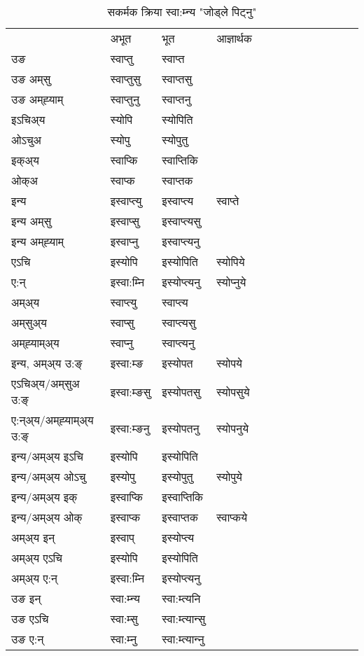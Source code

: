 \begin{table}[H]
\centering
\caption{\label{opt.vt} सकर्मक क्रिया  स्वा:म्‍न्य  "जोड्ले पिट्नु"  }
\begin{tabular}{l|l|l|l|l|l|l|l|l|l|l|l|l}  \toprule
&अभूत & भूत & आज्ञार्थक \\ 
उङ &स्वाप्‍तु &स्वाप्‍त \\ 
उङ अम्‌सु&स्वाप्‍तुसु &स्वाप्‍तसु \\ 
उङ अम्‌ह्‍याम्&स्वाप्‍तुनु &स्वाप्‍तनु \\ 
इऽचिअ्य &स्योपि &स्योपिति   \\ 
ओऽचुअ        &स्योपु &स्योपुतु   \\ 
इक्अ्य&स्वाप्कि &स्वाप्‍तिकि   \\ 
ओक्अ &स्वाप्क &स्वाप्‍तक   \\ 
इन्य & इस्वाप्‍त्यु  & इस्वाप्‍त्य &स्वाप्‍ते  \\ 
इन्य अम्‌सु& इस्वाप्सु  & इस्वाप्‍त्यसु   \\ 
इन्य अम्‌ह्‍याम्& इस्वाप्‍नु  & इस्वाप्‍त्यनु   \\ 
एऽचि & इस्योपि & इस्योपिति &स्योपिये    \\ 
ए:न् & इस्वा:म्‍नि  & इस्योप्‍त्यनु &स्योप्‍नुये  \\ 
अम्अ्य & स्वाप्‍त्यु  & स्वाप्‍त्य  \\ 
अम्‌सुअ्य & स्वाप्सु & स्वाप्‍त्यसु  \\ 
अम्‌ह्‍याम्अ्य & स्वाप्‍नु  & स्वाप्‍त्यनु \\ 
\midrule
इन्य, अम्अ्य उ:ङ्‌ &इस्वा:म्ङ &इस्योपत &स्योपये \\ 
एऽचिअ्य/अम्‌सुअ उ:ङ्‌ &इस्वा:म्ङसु &इस्योपतसु &स्योपसुये \\ 
ए:न्अ्य/अम्‌ह्‍याम्अ्य उ:ङ्‌ &इस्वा:म्ङनु &इस्योपतनु &स्योपनुये \\ 
इन्य/अम्अ्य इऽचि &इस्योपि &इस्योपिति    \\ 
इन्य/अम्अ्य ओऽचु &इस्योपु &इस्योपुतु  &स्योपुये  \\ 
इन्य/अम्अ्य इक् &इस्वाप्कि &इस्वाप्‍तिकि   \\ 
इन्य/अम्अ्य ओक् &इस्वाप्क &इस्वाप्‍तक  &स्वाप्कये  \\ 
अम्अ्य इन् & इस्वाप् & इस्योप्‍त्य   \\ 
अम्अ्य एऽचि & इस्योपि & इस्योपिति    \\ 
अम्अ्य ए:न् & इस्वा:म्‍नि  & इस्योप्‍त्यनु  \\ 
\midrule
उङ इन् & स्वा:म्‍न्य  & स्वा:म्त्यनि  \\ 
उङ एऽचि & स्वा:म्सु  & स्वा:म्त्यान्सु   \\ 
उङ ए:न्& स्वा:म्‍नु  & स्वा:म्त्यान्‍नु   \\ 
\bottomrule
\end{tabular}
\end{table}


